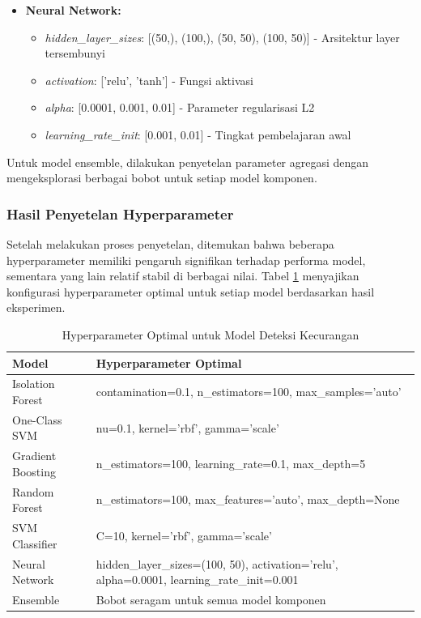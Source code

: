 \begin{itemize}
    \item \textbf{Neural Network:}
    \begin{itemize}
        \item \textit{hidden\_layer\_sizes}: [(50,), (100,), (50, 50), (100, 50)] - Arsitektur layer tersembunyi
        \item \textit{activation}: ['relu', 'tanh'] - Fungsi aktivasi
        \item \textit{alpha}: [0.0001, 0.001, 0.01] - Parameter regularisasi L2
        \item \textit{learning\_rate\_init}: [0.001, 0.01] - Tingkat pembelajaran awal
    \end{itemize}
\end{itemize}

Untuk model ensemble, dilakukan penyetelan parameter agregasi dengan mengeksplorasi berbagai bobot untuk setiap model komponen.

\subsubsection{Hasil Penyetelan Hyperparameter}

Setelah melakukan proses penyetelan, ditemukan bahwa beberapa hyperparameter memiliki pengaruh signifikan terhadap performa model, sementara yang lain relatif stabil di berbagai nilai. Tabel \ref{tabel:optimalHyperparameters} menyajikan konfigurasi hyperparameter optimal untuk setiap model berdasarkan hasil eksperimen.

\begin{table}[htbp]
\centering
\caption{Hyperparameter Optimal untuk Model Deteksi Kecurangan}
\label{tabel:optimalHyperparameters}
\begin{tabular}{|l|p{10cm}|}
\hline
\textbf{Model} & \textbf{Hyperparameter Optimal} \\
\hline
Isolation Forest & contamination=0.1, n\_estimators=100, max\_samples='auto' \\
\hline
One-Class SVM & nu=0.1, kernel='rbf', gamma='scale' \\
\hline
Gradient Boosting & n\_estimators=100, learning\_rate=0.1, max\_depth=5 \\
\hline
Random Forest & n\_estimators=100, max\_features='auto', max\_depth=None \\
\hline
SVM Classifier & C=10, kernel='rbf', gamma='scale' \\
\hline
Neural Network & hidden\_layer\_sizes=(100, 50), activation='relu', alpha=0.0001, learning\_rate\_init=0.001 \\
\hline
Ensemble & Bobot seragam untuk semua model komponen \\
\hline
\end{tabular}
\end{table}

